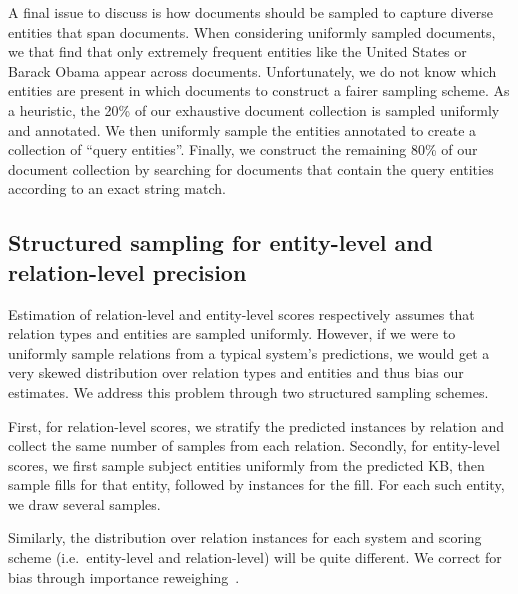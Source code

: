 A final issue to discuss is how documents should be sampled to capture diverse entities that span documents. %
When considering uniformly sampled documents, we that find that only extremely frequent entities like the United States or Barack Obama appear across documents.
Unfortunately, we do not know which entities are present in which documents to construct a fairer sampling scheme.
As a heuristic, the 20\% of our exhaustive document collection is sampled uniformly and annotated.
We then uniformly sample the entities annotated to create a collection of ``query entities''.
Finally, we construct the remaining 80\% of our document collection by searching for documents that contain the query entities according to an exact string match.

\subsection{Structured sampling for entity-level and relation-level precision}
Estimation of relation-level and entity-level scores respectively assumes that relation types and entities are sampled uniformly.
However, if we were to uniformly sample relations from a typical system's predictions, 
  we would get a very skewed distribution over relation types and entities and thus bias our estimates.
We address this problem through two structured sampling schemes.

First, for relation-level scores, we stratify the predicted instances by relation and collect the same number of samples from each relation.
Secondly, for entity-level scores,  we first sample subject entities uniformly from the predicted KB, then sample fills for that entity, followed by instances for the fill.
For each such entity, we draw several samples.

Similarly, the distribution over relation instances for each system and scoring scheme (i.e.\ entity-level and relation-level) will be quite different. We correct for bias through importance reweighing~\citep{}.

